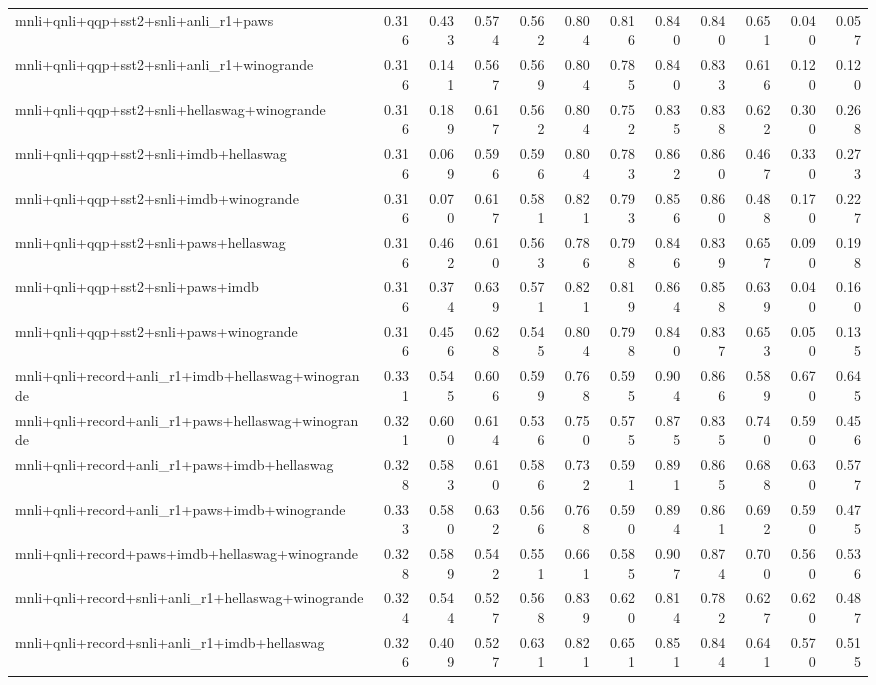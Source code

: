 \begin{table}[t]
\begin{tabular}{lrrrrrrrrrrr}
    mnli+qnli+qqp+sst2+snli+anli\_r1+paws & 0.316 & 0.433 & 0.574 & 0.562 & 0.804 & 0.816 & 0.840 & 0.840 & 0.651 & 0.040 & 0.057 \\
    mnli+qnli+qqp+sst2+snli+anli\_r1+winogrande & 0.316 & 0.141 & 0.567 & 0.569 & 0.804 & 0.785 & 0.840 & 0.833 & 0.616 & 0.120 & 0.120 \\
    mnli+qnli+qqp+sst2+snli+hellaswag+winogrande & 0.316 & 0.189 & 0.617 & 0.562 & 0.804 & 0.752 & 0.835 & 0.838 & 0.622 & 0.300 & 0.268 \\
    mnli+qnli+qqp+sst2+snli+imdb+hellaswag & 0.316 & 0.069 & 0.596 & 0.596 & 0.804 & 0.783 & 0.862 & 0.860 & 0.467 & 0.330 & 0.273 \\
    mnli+qnli+qqp+sst2+snli+imdb+winogrande & 0.316 & 0.070 & 0.617 & 0.581 & 0.821 & 0.793 & 0.856 & 0.860 & 0.488 & 0.170 & 0.227 \\
    mnli+qnli+qqp+sst2+snli+paws+hellaswag & 0.316 & 0.462 & 0.610 & 0.563 & 0.786 & 0.798 & 0.846 & 0.839 & 0.657 & 0.090 & 0.198 \\
    mnli+qnli+qqp+sst2+snli+paws+imdb & 0.316 & 0.374 & 0.639 & 0.571 & 0.821 & 0.819 & 0.864 & 0.858 & 0.639 & 0.040 & 0.160 \\
    mnli+qnli+qqp+sst2+snli+paws+winogrande & 0.316 & 0.456 & 0.628 & 0.545 & 0.804 & 0.798 & 0.840 & 0.837 & 0.653 & 0.050 & 0.135 \\
    mnli+qnli+record+anli\_r1+imdb+hellaswag+winogrande & 0.331 & 0.545 & 0.606 & 0.599 & 0.768 & 0.595 & 0.904 & 0.866 & 0.589 & 0.670 & 0.645 \\
    mnli+qnli+record+anli\_r1+paws+hellaswag+winogrande & 0.321 & 0.600 & 0.614 & 0.536 & 0.750 & 0.575 & 0.875 & 0.835 & 0.740 & 0.590 & 0.456 \\
    mnli+qnli+record+anli\_r1+paws+imdb+hellaswag & 0.328 & 0.583 & 0.610 & 0.586 & 0.732 & 0.591 & 0.891 & 0.865 & 0.688 & 0.630 & 0.577 \\
    mnli+qnli+record+anli\_r1+paws+imdb+winogrande & 0.333 & 0.580 & 0.632 & 0.566 & 0.768 & 0.590 & 0.894 & 0.861 & 0.692 & 0.590 & 0.475 \\
    mnli+qnli+record+paws+imdb+hellaswag+winogrande & 0.328 & 0.589 & 0.542 & 0.551 & 0.661 & 0.585 & 0.907 & 0.874 & 0.700 & 0.560 & 0.536 \\
    mnli+qnli+record+snli+anli\_r1+hellaswag+winogrande & 0.324 & 0.544 & 0.527 & 0.568 & 0.839 & 0.620 & 0.814 & 0.782 & 0.627 & 0.620 & 0.487 \\
    mnli+qnli+record+snli+anli\_r1+imdb+hellaswag & 0.326 & 0.409 & 0.527 & 0.631 & 0.821 & 0.651 & 0.851 & 0.844 & 0.641 & 0.570 & 0.515 \\

\end{tabular}
\end{table}
